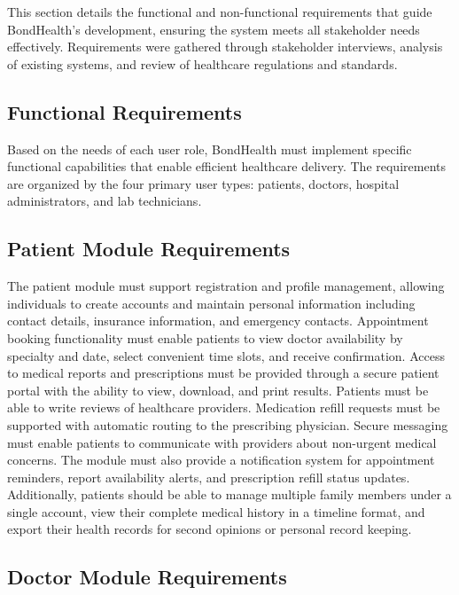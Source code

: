 \justifying
\noindent This section details the functional and non-functional requirements that guide BondHealth's development, ensuring the system meets all stakeholder needs effectively. Requirements were gathered through stakeholder interviews, analysis of existing systems, and review of healthcare regulations and standards.

\subsection{Functional Requirements}

\justifying
\noindent Based on the needs of each user role, BondHealth must implement specific functional capabilities that enable efficient healthcare delivery. The requirements are organized by the four primary user types: patients, doctors, hospital administrators, and lab technicians.

\subsection{Patient Module Requirements}

\justifying
\noindent The patient module must support registration and profile management, allowing individuals to create accounts and maintain personal information including contact details, insurance information, and emergency contacts. Appointment booking functionality must enable patients to view doctor availability by specialty and date, select convenient time slots, and receive confirmation. Access to medical reports and prescriptions must be provided through a secure patient portal with the ability to view, download, and print results. Patients must be able to write reviews of healthcare providers. Medication refill requests must be supported with automatic routing to the prescribing physician. Secure messaging must enable patients to communicate with providers about non-urgent medical concerns. The module must also provide a notification system for appointment reminders, report availability alerts, and prescription refill status updates. Additionally, patients should be able to manage multiple family members under a single account, view their complete medical history in a timeline format, and export their health records for second opinions or personal record keeping.

\subsection{Doctor Module Requirements}

